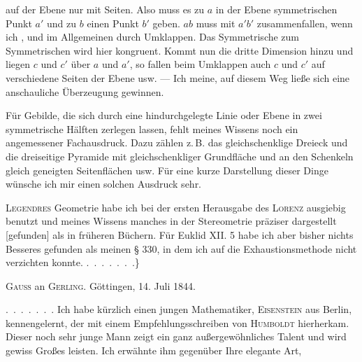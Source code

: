 %
\noindent auf der Ebene nur  mit  Seiten. Also muss es zu $a$ in der Ebene  symmetrischen Punkt $a'$ und zu $b$ einen Punkt $b'$ geben. $ab$ muss mit $a'b'$ zusammenfallen, wenn ich , und im Allgemeinen  durch Umklappen. Das Symmetrische zum Symmetrischen wird hier kongruent. Kommt nun die dritte Dimension hinzu und liegen  $c$ und $c'$ über $a$ und $a'$, so fallen beim Umklappen auch $c$ und $c'$ auf verschiedene Seiten der Ebene usw. --- Ich meine, auf diesem Weg ließe sich eine anschauliche Überzeugung gewinnen.

\begin{center}\end{center}

Für Gebilde, die sich durch eine hindurchgelegte Linie oder Ebene in zwei symmetrische Hälften zerlegen lassen, fehlt meines Wissens noch ein angemessener Fachausdruck. Dazu zählen z.\,B. das gleichschenklige Dreieck und die dreiseitige Pyramide mit gleichschenkliger Grundfläche und an den Schenkeln gleich geneigten Seitenflächen usw. Für eine kurze Darstellung dieser Dinge wünsche ich mir einen solchen Ausdruck sehr.

\textsc{Legendres} Geometrie habe ich bei der ersten Herausgabe des \textsc{Lorenz} ausgiebig benutzt und meines Wissens manches in der Stereometrie präziser dargestellt [gefunden] als in früheren Büchern. Für Euklid XII. 5 habe ich aber bisher nichts Besseres gefunden als meinen § 330, in dem ich auf die Exhaustionsmethode nicht verzichten konnte. \mbox{.\ .\ .\ .\ .\ .\ .}\}

\begin{center}
\textsc{Gauss} an \textsc{Gerling.} Göttingen, 14. Juli 1844.
\end{center}

\mbox{.\ .\ .\ .\ .\ .\ .} Ich habe kürzlich einen jungen Mathematiker, \textsc{Eisenstein} aus Berlin, kennengelernt, der mit einem Empfehlungsschreiben von \textsc{Humboldt} hierherkam. Dieser noch sehr junge Mann zeigt ein ganz außergewöhnliches Talent und wird gewiss Großes leisten. Ich erwähnte ihm gegenüber Ihre elegante Art,\space%
